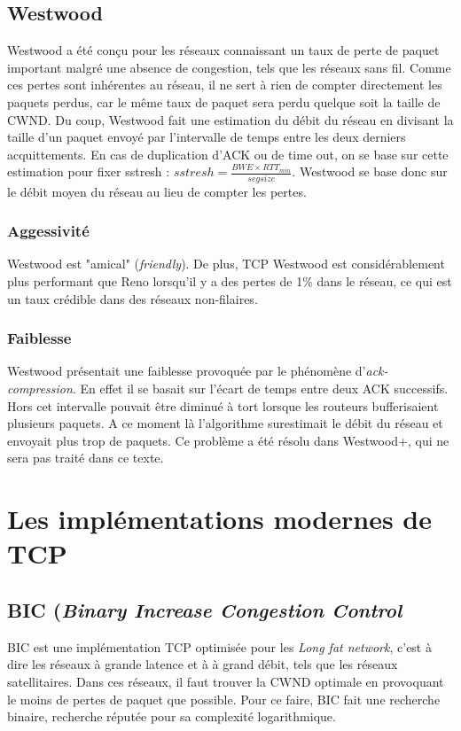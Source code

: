 \documentclass[	DIV=calc,%
							paper=a4,%
							fontsize=11pt,%
							twocolumn]{scrartcl}	 					%
\begin{document}
\subsection*{Westwood}
Westwood a été conçu pour les réseaux connaissant un taux de perte de paquet important malgré une absence de congestion, tels que les réseaux sans fil. Comme ces pertes sont inhérentes au réseau, il ne sert à rien de compter directement les paquets perdus, car le même taux de paquet sera perdu quelque soit la taille de CWND. Du coup, Westwood fait une estimation du débit du réseau en divisant la taille d'un paquet envoyé par l'intervalle de temps entre les deux derniers acquittements. En cas de duplication d'ACK ou de time out, on se base sur cette estimation pour fixer sstresh : $sstresh=\frac{BWE \times RTT_{min}}{segsize} $. Westwood se base donc sur le débit moyen du réseau au lieu de compter les pertes.

\subsubsection*{Aggessivité}
Westwood est "amical" (\textit{friendly}). De plus, TCP Westwood est considérablement plus performant que Reno lorsqu'il y a des pertes de 1\% dans le réseau, ce qui est un taux crédible dans des réseaux non-filaires\cite{Casetti02}.

\subsubsection*{Faiblesse}
Westwood présentait une faiblesse provoquée par le phénomène d'\textit{ack-compression}. En effet il se basait sur l'écart de temps entre deux ACK successifs. Hors cet intervalle pouvait être diminué à tort lorsque les routeurs bufferisaient plusieurs paquets. A ce moment là l'algorithme surestimait le débit du réseau et envoyait plus trop de paquets. Ce problème a été résolu dans Westwood+, qui ne sera pas traité dans ce texte.

\section*{Les implémentations modernes de TCP}
\subsection*{BIC (\textit{\textbf{B}inary \textbf{I}ncrease \textbf{C}ongestion Control}}
BIC est une implémentation TCP optimisée pour les \textit{Long fat network}, c'est à dire les réseaux à grande latence et à à grand débit, tels que les réseaux satellitaires. Dans ces réseaux, il faut trouver la CWND optimale en provoquant le moins de pertes de paquet que possible. Pour ce faire, BIC fait une recherche binaire, recherche réputée pour sa complexité logarithmique.
\end{document}

